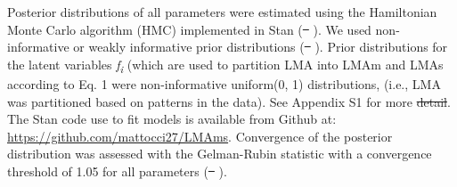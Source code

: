 \documentclass[
  12pt,
  letterpaper,
  DIV=11,
  numbers=noendperiod]{scrartcl}
\providecommand{\DIFadd}[1]{{\protect\color{blue}\uwave{#1}}} %
\providecommand{\DIFdel}[1]{{\protect\color{red}\sout{#1}}}                      %
\providecommand{\DIFaddbegin}{} %
\providecommand{\DIFaddend}{} %
\providecommand{\DIFdelbegin}{} %
\providecommand{\DIFdelend}{} %
\newcommand{\DIFscaledelfig}{0.5}
\newlength{\DIFdelgraphicswidth} %
\newlength{\DIFdelgraphicsheight} %
\newcommand{\DIFaddincludegraphics}[2][]{{\color{blue}\fbox{\DIFOincludegraphics[#1]{#2}}}} %
\newcommand{\DIFdelincludegraphics}[2][]{%
\sbox{\DIFdelgraphicsbox}{\DIFOincludegraphics[#1]{#2}}%
\settoboxwidth{\DIFdelgraphicswidth}{\DIFdelgraphicsbox} %
\settoboxtotalheight{\DIFdelgraphicsheight}{\DIFdelgraphicsbox} %
\scalebox{\DIFscaledelfig}{%
\parbox[b]{\DIFdelgraphicswidth}{\usebox{\DIFdelgraphicsbox}\\[-\baselineskip] \rule{\DIFdelgraphicswidth}{0em}}\llap{\resizebox{\DIFdelgraphicswidth}{\DIFdelgraphicsheight}{%
\setlength{\unitlength}{\DIFdelgraphicswidth}%
\begin{picture}(1,1)%
\thicklines\linethickness{2pt} %
{\color[rgb]{1,0,0}\put(0,0){\framebox(1,1){}}}%
{\color[rgb]{1,0,0}\put(0,0){\line( 1,1){1}}}%
{\color[rgb]{1,0,0}\put(0,1){\line(1,-1){1}}}%
\end{picture}%
}\hspace*{3pt}}} %
} %
\DeclareRobustCommand{\DIFaddbegin}{\DIFOaddbegin \let\includegraphics\DIFaddincludegraphics} %
\DeclareRobustCommand{\DIFaddend}{\DIFOaddend \let\includegraphics\DIFOincludegraphics} %
\DeclareRobustCommand{\DIFdelbegin}{\DIFOdelbegin \let\includegraphics\DIFdelincludegraphics} %
\DeclareRobustCommand{\DIFdelend}{\DIFOaddend \let\includegraphics\DIFOincludegraphics} %
\begin{document}
Posterior distributions of all parameters were estimated using the
Hamiltonian Monte Carlo algorithm (HMC) implemented in Stan
(\DIFdelbegin \DIFdel{\mbox{%
\citeproc{ref-Carpenter2017}{Carpenter et al. 2017}}\hspace{0pt}%
}\DIFdelend \DIFaddbegin \DIFadd{\mbox{%
\citeproc{ref-Carpenter2017}{Carpenter et al., 2017}}\hspace{0pt}%
}\DIFaddend ). We used
non-informative or weakly informative prior distributions
(\DIFdelbegin \DIFdel{\mbox{%
\citeproc{ref-Lemoine2019}{Lemoine 2019}}\hspace{0pt}%
}\DIFdelend \DIFaddbegin \DIFadd{\mbox{%
\citeproc{ref-Lemoine2019}{Lemoine, 2019}}\hspace{0pt}%
}\DIFaddend ). Prior distributions for the
latent variables \emph{f\textsubscript{i}} (which are used to partition
LMA into LMAm and LMAs according to Eq. 1 were non-informative
uniform(0, 1) distributions, (i.e., LMA was partitioned based on
patterns in the data). See Appendix S1 for more \DIFdelbegin \DIFdel{detail}\DIFdelend \DIFaddbegin \DIFadd{details}\DIFaddend . The Stan code
use to fit models is available from Github at:
\url{https://github.com/mattocci27/LMAms}. Convergence of the posterior
distribution was assessed with the Gelman-Rubin statistic with a
convergence threshold of 1.05 for all parameters
(\DIFdelbegin \DIFdel{\mbox{%
\citeproc{ref-Gelman2013}{Gelman et al. 2013}}\hspace{0pt}%
}\DIFdelend \DIFaddbegin \DIFadd{\mbox{%
\citeproc{ref-Gelman2013}{Gelman et al., 2013}}\hspace{0pt}%
}\DIFaddend ).
\end{document}
